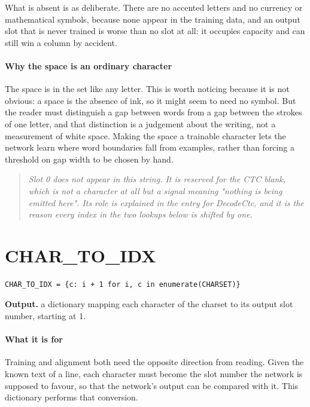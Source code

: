 What is absent is as deliberate. There are no accented letters and no currency or mathematical symbols, because none appear in the training data, and an output slot that is never trained is worse than no slot at all: it occupies capacity and can still win a column by accident.


\paragraph{Why the space is an ordinary character}
The space is in the set like any letter. This is worth noticing because it is not obvious: a space is the absence of ink, so it might seem to need no symbol. But the reader must distinguish a gap between words from a gap between the strokes of one letter, and that distinction is a judgement about the writing, not a measurement of white space. Making the space a trainable character lets the network learn where word boundaries fall from examples, rather than forcing a threshold on gap width to be chosen by hand.


\begin{quote}\small\itshape Slot 0 does not appear in this string. It is reserved for the CTC blank, which is not a character at all but a signal meaning "nothing is being emitted here". Its role is explained in the entry for DecodeCtc, and it is the reason every index in the two lookups below is shifted by one.\end{quote}

\section{CHAR\_TO\_IDX}
\begin{lstlisting}[style=sig]
CHAR_TO_IDX = {c: i + 1 for i, c in enumerate(CHARSET)}
\end{lstlisting}

\noindent\textbf{Output.} a dictionary mapping each character of the charset to its output slot number, starting at 1.


\paragraph{What it is for}
Training and alignment both need the opposite direction from reading. Given the known text of a line, each character must become the slot number the network is supposed to favour, so that the network's output can be compared with it. This dictionary performs that conversion.


